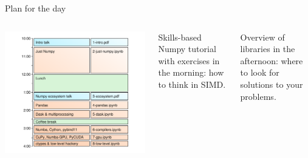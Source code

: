 \documentclass[aspectratio=169]{beamer}
\begin{document}
\begin{frame}{Plan for the day}
\large
\begin{columns}
\includegraphics[width=\linewidth]{../img/plan-for-the-day.png}

Skills-based Numpy tutorial with exercises in the morning: how to think in SIMD.

\vspace{1 cm}
Overview of libraries in the afternoon: where to look for solutions to your problems.
\end{columns}
\end{frame}
\end{document}
